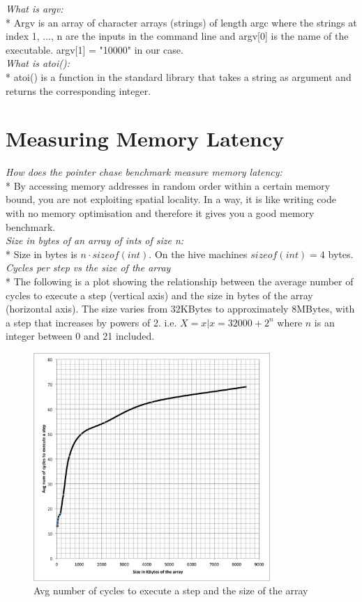\documentclass[11pt,letter]{article}
\begin{document}
\noindent\emph{What is argv:}\\*
Argv is an array of character arrays (strings) of length argc where the strings at index 1, ..., n are the inputs in the command line and argv[0] is the name of the executable. argv[1] = "10000" in our case.\\[10pt]

\noindent\emph{What is atoi():}\\*
atoi() is a function in the standard library that takes a string as argument and returns the corresponding integer.

\section{Measuring Memory Latency}

\noindent\emph{How does the pointer chase benchmark measure memory latency:}\\*
By accessing memory addresses in random order within a certain memory bound, you are not exploiting spatial locality. In a way, it is like writing code with no memory optimisation and therefore it gives you a good memory benchmark.\\[10pt]

\noindent\emph{Size in bytes of an array of ints of size n:}\\*
Size in bytes is $n \cdot sizeof(int)$. On the hive machines $sizeof(int) = 4$ bytes.\\[10pt]

\noindent\emph{Cycles per step vs the size of the array}\\*
The following is a plot showing the relationship between the average number of cycles to execute a step (vertical axis) and the size in bytes of the array (horizontal axis). The size varies from 32KBytes to approximately 8MBytes, with a step that increases by powers of 2. i.e. $X = {x | x = 32000 + 2^n}$ where $n$ is an integer between 0 and 21 included.
\begin{figure}[h]
\centering
\includegraphics[width=0.8\textwidth]{graph_ptr.png}
\caption{Avg number of cycles to execute a step and the size of the array}
\label{fig:awesome_image}
\end{figure}
\end{document}
